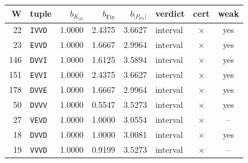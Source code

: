 \begin{tabular}{@{}rl rrr l c c@{}}
\toprule
W & tuple & $b_{K_M}$ & $b_{\mathrm{Fix}}$ & $b_{|P_{\mathrm{rec}}|}$ & verdict & cert & weak \\
\midrule
22 & \texttt{IVVD} & 1.0000 & 2.4375 & 3.6627 & interval & $\times$ & yes \\
23 & \texttt{EVVD} & 1.0000 & 1.6667 & 2.9964 & interval & $\times$ & yes \\
146 & \texttt{DVVI} & 1.0000 & 1.6125 & 3.5894 & interval & $\times$ & yes \\
151 & \texttt{EVVI} & 1.0000 & 2.4375 & 3.6627 & interval & $\times$ & yes \\
178 & \texttt{DVVE} & 1.0000 & 1.6667 & 2.9964 & interval & $\times$ & yes \\
50 & \texttt{DVVV} & 1.0000 & 0.5547 & 3.5273 & interval & $\times$ & yes \\
27 & \texttt{VEVD} & 1.0000 & 1.0000 & 3.0554 & interval & $\times$ & -- \\
18 & \texttt{DVVD} & 1.0000 & 1.0000 & 3.0081 & interval & $\times$ & yes \\
19 & \texttt{VVVD} & 1.0000 & 0.9199 & 3.5273 & interval & $\times$ & -- \\
\bottomrule
\end{tabular}
